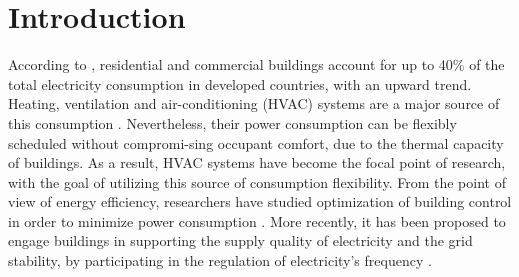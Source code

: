 
\section{Introduction}
\label{sec:Introduction}
According to \cite{Perez-Lombard:2008aa}, residential and commercial buildings account for up to 40\% of the total electricity consumption in developed countries, with an upward trend. Heating, ventilation and air-conditioning (HVAC) systems are a major source of this consumption \cite{:aa}. %
Nevertheless, their power consumption can be flexibly scheduled without compromi-sing occupant comfort, due to the thermal capacity of buildings. As a result, HVAC systems have become the focal point of research, with the goal of utilizing this source of consumption flexibility. From the point of view of energy efficiency, researchers have studied optimization of building control in order to minimize power consumption \cite{Siroky:2011aa, Parisio:2014aa}.  %
More recently, it has been proposed to engage buildings in supporting the supply quality of electricity and the grid stability, by participating in the regulation of electricity's frequency \cite{Balandat:2014aa, Lin:2015aa, Vrettos:2014aa, Baccino:2014aa}.



